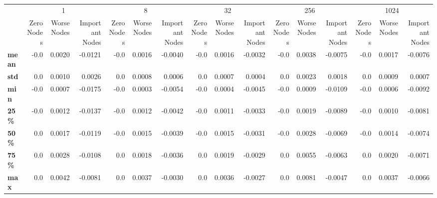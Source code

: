 \begin{tabular}{lrrrrrrrrrrrrrrr}
\toprule
{} & \multicolumn{3}{c}{1} & \multicolumn{3}{c}{8} & \multicolumn{3}{c}{32} & \multicolumn{3}{c}{256} & \multicolumn{3}{c}{1024} \\
{} & Zero Nodes & Worse Nodes & Important Nodes & Zero Nodes & Worse Nodes & Important Nodes & Zero Nodes & Worse Nodes & Important Nodes & Zero Nodes & Worse Nodes & Important Nodes & Zero Nodes & Worse Nodes & Important Nodes \\
\midrule
\textbf{mean} &       -0.0 &      0.0020 &         -0.0121 &       -0.0 &      0.0016 &         -0.0040 &       -0.0 &      0.0016 &         -0.0032 &       -0.0 &      0.0038 &         -0.0075 &       -0.0 &      0.0017 &         -0.0076 \\
\textbf{std } &        0.0 &      0.0010 &          0.0026 &        0.0 &      0.0008 &          0.0006 &        0.0 &      0.0007 &          0.0004 &        0.0 &      0.0023 &          0.0018 &        0.0 &      0.0009 &          0.0007 \\
\textbf{min } &       -0.0 &      0.0007 &         -0.0175 &       -0.0 &      0.0003 &         -0.0054 &       -0.0 &      0.0004 &         -0.0045 &       -0.0 &      0.0009 &         -0.0109 &       -0.0 &      0.0006 &         -0.0092 \\
\textbf{25\% } &       -0.0 &      0.0012 &         -0.0137 &       -0.0 &      0.0012 &         -0.0042 &       -0.0 &      0.0011 &         -0.0033 &       -0.0 &      0.0019 &         -0.0089 &       -0.0 &      0.0010 &         -0.0081 \\
\textbf{50\% } &        0.0 &      0.0017 &         -0.0119 &       -0.0 &      0.0015 &         -0.0039 &       -0.0 &      0.0015 &         -0.0031 &       -0.0 &      0.0028 &         -0.0069 &       -0.0 &      0.0014 &         -0.0074 \\
\textbf{75\% } &        0.0 &      0.0028 &         -0.0108 &        0.0 &      0.0018 &         -0.0036 &        0.0 &      0.0019 &         -0.0029 &        0.0 &      0.0055 &         -0.0063 &        0.0 &      0.0020 &         -0.0071 \\
\textbf{max } &        0.0 &      0.0042 &         -0.0081 &        0.0 &      0.0037 &         -0.0030 &        0.0 &      0.0036 &         -0.0027 &        0.0 &      0.0081 &         -0.0047 &        0.0 &      0.0037 &         -0.0066 \\
\bottomrule
\end{tabular}
